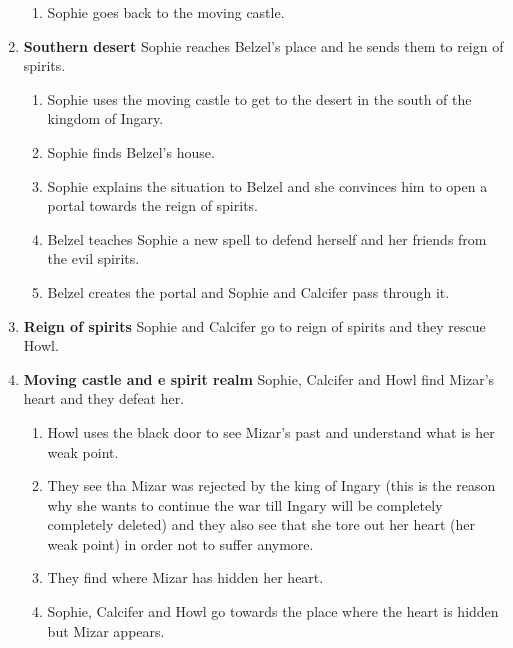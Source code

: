\begin{enumerate}
\begin{enumerate}
  \item Sophie goes back to the moving castle.
  \end{enumerate}

\item \textbf{Southern desert} Sophie reaches Belzel’s place and he sends them to reign of spirits.

  \begin{enumerate}
  \item Sophie uses the moving castle to get to the desert in the south of the kingdom of Ingary.
    
  \item Sophie finds Belzel’s house.
    
  \item Sophie explains the situation to Belzel and she convinces him to open a portal towards the reign of spirits.
    
  \item Belzel teaches Sophie a new spell to defend herself and her friends from the evil spirits.
    
  \item Belzel creates the portal and Sophie and Calcifer pass through it.
  \end{enumerate}

\item \textbf{Reign of spirits} Sophie and Calcifer go to reign of spirits and they rescue Howl.

\item \textbf{Moving castle and e spirit realm}  Sophie, Calcifer and Howl find Mizar’s heart and they defeat her.

  \begin{enumerate}
  \item Howl uses the black door to see Mizar’s past and understand what is her weak point.
    
  \item They see tha Mizar was rejected by the king of Ingary (this is the reason why she wants to continue the war till Ingary will be completely completely deleted) and they also see that she tore out her heart (her weak point) in order not to suffer anymore.
    
  \item They find where Mizar has hidden her heart.
    
  \item Sophie, Calcifer and Howl go towards the place where the heart is hidden but Mizar appears.
    

\end{enumerate}
\end{enumerate}
